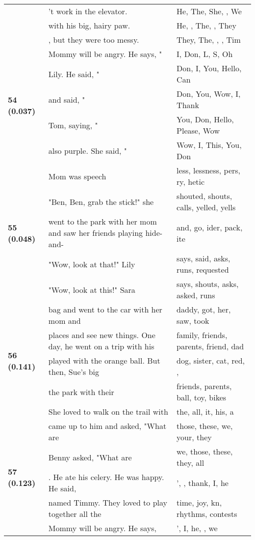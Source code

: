 \documentclass{article}
\begin{document}
\begin{adjustbox}{max width=\textwidth}
\begin{tabular}{p{} p{} p{}}
 & 't work in the elevator. & He,  The,  She,  ,  We \\
 & with his big, hairy paw. & He,  ,  The,   ,  They \\
 & , but they were too messy. & They,  The,   ,  ,  Tim \\
\midrule
\multirow{5}{*}{\textbf{54 (0.037)}} & Mommy will be angry. He says, " & I, Don, L, S, Oh \\
 & Lily. He said, " & Don, I, You, Hello, Can \\
 & and said, " & Don, You, Wow, I, Thank \\
 & Tom, saying, " & You, Don, Hello, Please, Wow \\
 & also purple. She said, " & Wow, I, This, You, Don \\
\midrule
\multirow{5}{*}{\textbf{55 (0.048)}} & Mom was speech & less, lessness, pers, ry, hetic \\
 & "Ben, Ben, grab the stick!" she & shouted,  shouts,  calls,  yelled,  yells \\
 & went to the park with her mom and saw her friends playing hide-and- & and, go, ider, pack, ite \\
 & "Wow, look at that!" Lily & says,  said,  asks,  runs,  requested \\
 & "Wow, look at this!" Sara & says,  shouts,  asks,  asked,  runs \\
\midrule
\multirow{5}{*}{\textbf{56 (0.141)}} & bag and went to the car with her mom and & daddy,  got,  her,  saw,  took \\
 & places and see new things. One day, he went on a trip with his & family,  friends,  parents,  friend,  dad \\
 & played with the orange ball. But then, Sue's big & dog,  sister,  cat,  red, , \\
 & the park with their & friends,  parents,  ball,  toy,  bikes \\
 & She loved to walk on the trail with & the,  all,  it,  his,  a \\
\midrule
\multirow{5}{*}{\textbf{57 (0.123)}} & came up to him and asked, "What are & those,  these,  we,  your,  they \\
 & Benny asked, "What are & we,  those,  these,  they,  all \\
 & . He ate his celery. He was happy. He said, & ',  ,  thank,  I,  he \\
 & named Timmy. They loved to play together all the & time,  joy,  kn,  rhythms,  contests \\
 & Mommy will be angry. He says, & ',  I,  he,  ,  we \\

\end{tabular}
\end{adjustbox}
\end{document}
